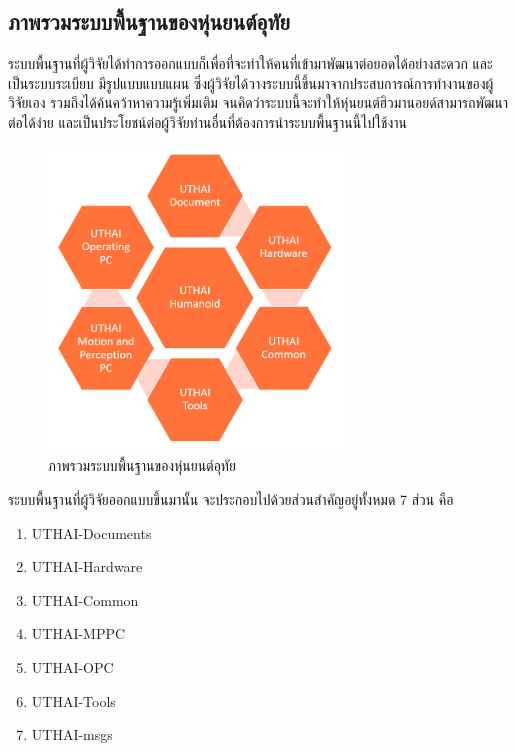 \clearpage
\subsection{ภาพรวมระบบพื้นฐานของหุ่นยนต์อุทัย}
ระบบพื้นฐานที่ผู้วิจัยได้ทำการออกแบบก็เพื่อที่จะทำให้คนที่เข้ามาพัฒนาต่อยอดได้อย่างสะดวก และเป็นระบบระเบียบ
มีรูปแบบแบบแผน ซึ่งผู้วิจัยได้วางระบบนี้ขึ้นมาจากประสบการณ์การทำงานของผู้วิจัยเอง รวมถึงได้ค้นคว้าหาความรู้เพิ่มเติม
จนคิดว่าระบบนี้จะทำให้หุ่นยนต์ฮิวมานอยด์สามารถพัฒนาต่อได้ง่าย และเป็นประโยชน์ต่อผู้วิจัยท่านอื่นที่ต้องการนำระบบพื้นฐานนี้ไปใช้งาน

\begin{figure}[!ht]
	\centering
	\includegraphics[width=0.7\textwidth]{chapter4/images/uthai_platform.png}
	\caption{ภาพรวมระบบพื้นฐานของหุ่นยนต์อุทัย}
	\label{fig:uthai_platform}
\end{figure}

ระบบพื้นฐานที่ผู้วิจัยออกแบบขึ้นมานั้น จะประกอบไปด้วยส่วนสำคัญอยู่ทั้งหมด 7 ส่วน คือ
\vspace{-10pt}
\begin{enumerate}[label=\arabic*., leftmargin=2.5cm]
    \setlength\itemsep{-0.25em}
    \item UTHAI-Documents
    \item UTHAI-Hardware
    \item UTHAI-Common
    \item UTHAI-MPPC
    \item UTHAI-OPC
    \item UTHAI-Tools
    \item UTHAI-msgs
\end{enumerate}

